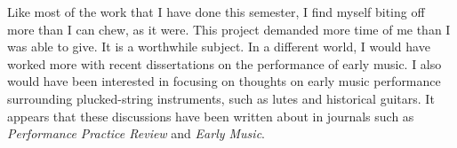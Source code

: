 \documentclass[12pt]{article}
\begin{document}
Like most of the work that I have done this semester, I find myself
biting off more than I can chew, as it were. This project demanded
more time of me than I was able to give. It is a worthwhile
subject. In a different world, I would have worked more with recent
dissertations on the performance of early music. I also would have
been interested in focusing on thoughts on early music performance
surrounding plucked-string instruments, such as lutes and historical
guitars. It appears that these discussions have been written about in
journals such as \emph{Performance Practice Review} and \emph{Early Music}.

\clearpage
\printbibliography
\end{document}
